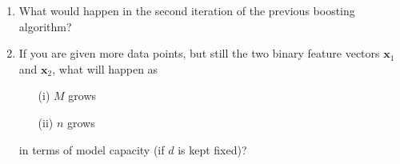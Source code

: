\documentclass[a4paper]{article}
\newcommand{\exexams}
  {\color{black} \hrule \section{Further exercises}}
\newcommand{\exinspo}
  {\color{black} \hrule \section{Ideas \& exercises from other sources}}
\newcounter{aufg}
\newcounter{loes}
\begin{document}
{\begin{enumerate}
\item What would happen in the second iteration of the previous boosting algorithm?
\item If you are given more data points, but still the two binary feature vectors $\bm{x}_1$ and $\bm{x}_2$, what will happen as 
\begin{itemize}
\item[(i)] $M$ grows
\item[(ii)] $n$ grows
\end{itemize}
in terms of model capacity (if $d$ is kept fixed)?
\end{enumerate}


}

% 
% 
% 
% 
% 
\end{document}
